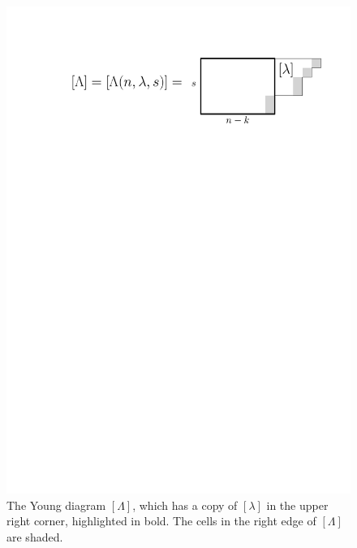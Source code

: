 \documentclass[11pt]{amsart}
\theoremstyle{definition}
\begin{document}
\begin{figure}
    \centering
    \includegraphics[scale=0.45]{Figures/LambdaExMain.pdf}
    \caption{The Young diagram $[\Lambda]$, which has a copy of $[\lambda]$ in the upper right corner, highlighted in bold. The cells in the right edge of $[\Lambda]$ are shaded.
    }
    \label{fig:Lambda}
\end{figure}
\end{document}
